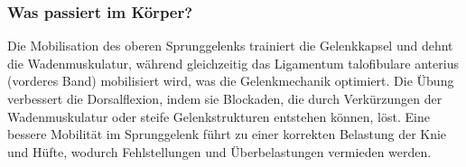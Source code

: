 
\subsubsection{Was passiert im Körper?}
Die Mobilisation des oberen Sprunggelenks trainiert die Gelenkkapsel und dehnt die Wadenmuskulatur, während gleichzeitig das Ligamentum talofibulare anterius (vorderes Band) mobilisiert wird, was die Gelenkmechanik optimiert.
Die Übung verbessert die Dorsalflexion, indem sie Blockaden, die durch Verkürzungen der Wadenmuskulatur oder steife Gelenkstrukturen entstehen können, löst.
Eine bessere Mobilität im Sprunggelenk führt zu einer korrekten Belastung der Knie und Hüfte, wodurch Fehlstellungen und Überbelastungen vermieden werden.








